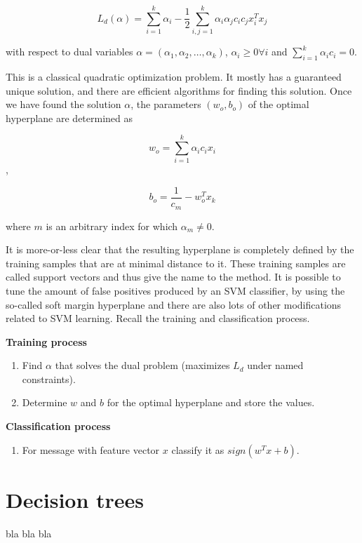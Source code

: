 \documentclass[12pt]{report}
\begin{document}
$$L_d(\alpha) = \sum_{i = 1}^{k} \alpha_i - \frac{1}{2} \sum_{i, j = 1}^{k} \alpha_i \alpha_j c_i c_j x_i^T x_j$$

with respect to dual variables $\alpha = (\alpha_1, \alpha_2, \dots, \alpha_k)$, $\alpha_i \ge 0 \forall i$ and $\sum_{i = 1}^{k} \alpha_i c_i = 0$.

This is a classical quadratic optimization problem. It mostly has a guaranteed unique solution, and there are efficient algorithms for finding this solution. Once we have found the solution $\alpha$, the parameters $(w_o, b_o)$ of the optimal hyperplane are determined as

$$w_o = \sum_{i = 1}^{k} \alpha_i c_i x_i$$,

$$b_o = \frac{1}{c_m} - w_o^T x_k$$

where $m$ is an arbitrary index for which $\alpha_m \ne 0$.

It is more-or-less clear that the resulting hyperplane is completely defined by the training samples that are at minimal distance to it. These training samples are called support vectors and thus give the name to the method. It is possible to tune the amount of false positives produced by an SVM classifier, by using the so-called soft margin hyperplane and there are also lots of other modifications related to SVM learning. Recall the training and classification process.

\textbf{Training process}

\begin{enumerate}
	\item Find $\alpha$ that solves the dual problem (maximizes $L_d$ under named
	constraints).
	\item Determine $w$ and $b$ for the optimal hyperplane and store the values.
\end{enumerate}

\textbf{Classification process}

\begin{enumerate}
	\item For message with feature vector $x$ classify it as $sign(w^T x + b)$.
\end{enumerate}

\newpage

\section{Decision trees}

bla bla bla

\newpage
\end{document}

